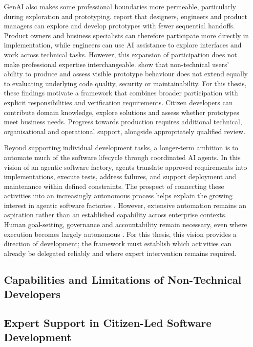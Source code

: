 \documentclass[10pt,a4paper]{article}
\begin{document}
GenAI also makes some professional boundaries more permeable, particularly during exploration and prototyping. \textcite{li2026product} report that designers, engineers and product managers can explore and develop prototypes with fewer sequential handoffs. Product owners and business specialists can therefore participate more directly in implementation, while engineers can use AI assistance to explore interfaces and work across technical tasks. However, this expansion of participation does not make professional expertise interchangeable. \textcite{kobiella2026} show that non-technical users' ability to produce and assess visible prototype behaviour does not extend equally to evaluating underlying code quality, security or maintainability.
For this thesis, these findings motivate a framework that combines broader participation with explicit responsibilities and verification requirements. Citizen developers can contribute domain knowledge, explore solutions and assess whether prototypes meet business needs. Progress towards production requires additional technical, organisational and operational support, alongside appropriately qualified review.

Beyond supporting individual development tasks, a longer-term ambition is to automate much of the software lifecycle through coordinated AI agents. In this vision of an agentic software factory, agents translate approved requirements into implementations, execute tests, address failures, and support deployment and maintenance within defined constraints. The prospect of connecting these activities into an increasingly autonomous process helps explain the growing interest in agentic software factories \parencite{mandl2026}. However, extensive automation remains an aspiration rather than an established capability across enterprise contexts. Human goal-setting, governance and accountability remain necessary, even where execution becomes largely autonomous \parencite{mandl2026,meske2025}. For this thesis, this vision provides a direction of development; the framework must establish which activities can already be delegated reliably and where expert intervention remains required.


\subsection{Capabilities and Limitations of Non-Technical Developers}

\subsection{Expert Support in Citizen-Led Software Development}
\end{document}
